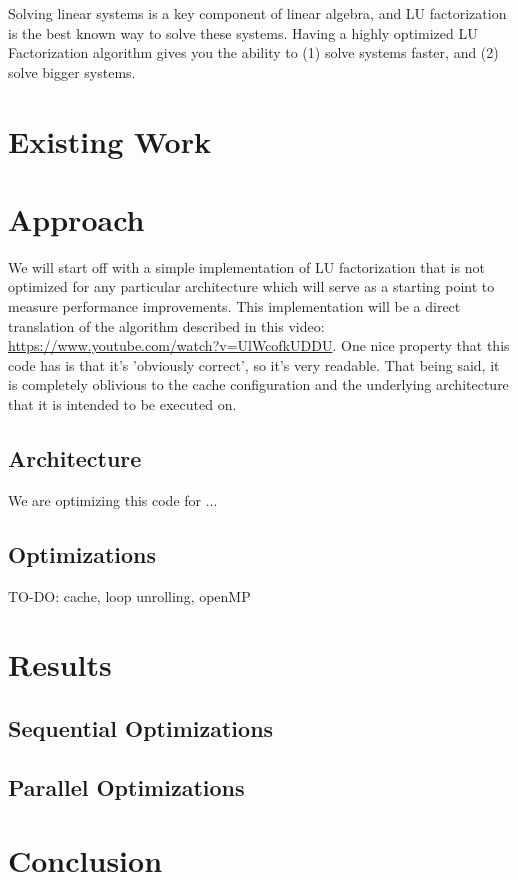 \documentclass[12]{article}
\begin{document}
Solving linear systems is a key component of linear algebra, and LU factorization is the best known way to solve these systems.  Having a highly optimized LU Factorization algorithm gives you the ability to (1) solve systems faster, and (2) solve bigger systems. 

\section{Existing Work}

\section{Approach}

We will start off with a simple implementation of LU factorization that is not optimized for any particular architecture which will serve as a starting point to measure performance improvements.  This implementation will be a direct translation of the algorithm described in this video: 
\url{https://www.youtube.com/watch?v=UlWcofkUDDU}.  One nice property that this code has is that it's 'obviously correct', so it's very readable.  That being said, it is completely oblivious to the cache configuration and the underlying architecture that it is intended to be executed on.

\subsection{Architecture}

We are optimizing this code for ...

\subsection{Optimizations}

TO-DO: cache, loop unrolling, openMP

\section{Results}

\subsection{Sequential Optimizations}

\subsection{Parallel Optimizations}

\section{Conclusion}
\end{document}
